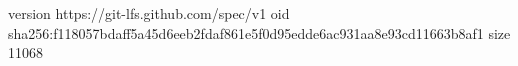 version https://git-lfs.github.com/spec/v1
oid sha256:f118057bdaff5a45d6eeb2fdaf861e5f0d95edde6ac931aa8e93cd11663b8af1
size 11068
